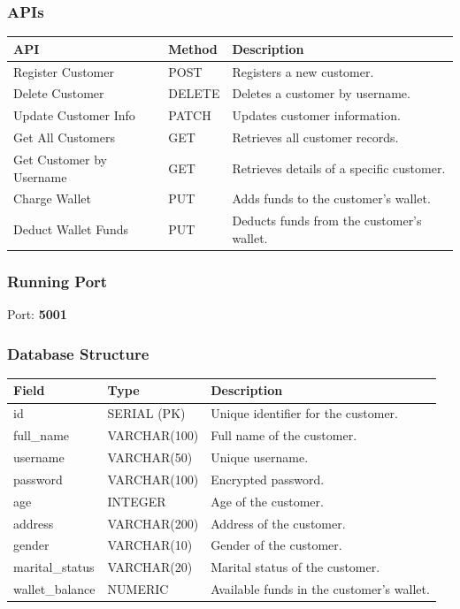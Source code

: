 \documentclass[a4paper,12pt]{article}
\begin{document}
\subsubsection{APIs}
\begin{longtable}{|p{4cm}|p{2cm}|p{7cm}|}
\hline
\textbf{API} & \textbf{Method} & \textbf{Description} \\
\hline
Register Customer & POST & Registers a new customer. \\
\hline
Delete Customer & DELETE & Deletes a customer by username. \\
\hline
Update Customer Info & PATCH & Updates customer information. \\
\hline
Get All Customers & GET & Retrieves all customer records. \\
\hline
Get Customer by Username & GET & Retrieves details of a specific customer. \\
\hline
Charge Wallet & PUT & Adds funds to the customer's wallet. \\
\hline
Deduct Wallet Funds & PUT & Deducts funds from the customer's wallet. \\
\hline
\end{longtable}

\subsubsection{Running Port}
Port: \textbf{5001}

\subsubsection{Database Structure}
\begin{longtable}{|p{3cm}|p{3cm}|p{8cm}|}
\hline
\textbf{Field} & \textbf{Type} & \textbf{Description} \\
\hline
id & SERIAL (PK) & Unique identifier for the customer. \\
\hline
full\_name & VARCHAR(100) & Full name of the customer. \\
\hline
username & VARCHAR(50) & Unique username. \\
\hline
password & VARCHAR(100) & Encrypted password. \\
\hline
age & INTEGER & Age of the customer. \\
\hline
address & VARCHAR(200) & Address of the customer. \\
\hline
gender & VARCHAR(10) & Gender of the customer. \\
\hline
marital\_status & VARCHAR(20) & Marital status of the customer. \\
\hline
wallet\_balance & NUMERIC & Available funds in the customer's wallet. \\
\hline
\end{longtable}
\end{document}
